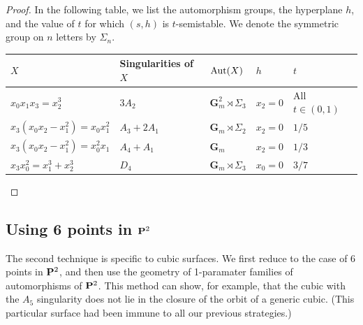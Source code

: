 \documentclass[12pt,reqno]{amsart}
\numberwithin{equation}{section}
\newcommand{\G}{\mathbf G}
\begin{document}
\begin{proof}
  In the following table, we list the automorphism groups, the hyperplane $h$, and the value of $t$ for which $(s,h)$ is $t$-semistable.
  We denote the symmetric group on $n$ letters by $\Sigma_n$.
  \begin{center}
  \begin{tabular}{l l l l l}
    \toprule
    $X$ & Singularities of $X$& $\Aut(X)$ & $h$ & $t$\\
    \midrule
    $x_0x_1x_3 = x_2^3$& $3A_2$&$\G_m^2 \rtimes \Sigma_3$ & $x_2 = 0$ & All $t \in (0,1)$\\
    $x_3(x_0x_2-x_1^2) = x_0x_1^2$& $A_3+2A_1$&$\G_m \rtimes \Sigma_2$ & $x_2 = 0$ & $1/5$ \\
    $x_3(x_0x_2-x_1^2) = x_0^2x_1$&$A_4+A_1$& $\G_m$ & $x_2 = 0$ & $1/3$\\
    $x_3x_0^2 = x_1^3 + x_2^3$&$D_4$& $\G_m \rtimes \Sigma_3$ & $x_0 = 0$ & $3/7$\\
    \bottomrule
  \end{tabular}
\end{center}
\end{proof}

\subsection{Using 6 points in $\P^2$}
The second technique is specific to cubic surfaces.
We first reduce to the case of 6 points in $\P^2$, and then use the geometry of 1-paramater families of automorphisms of $\P^2$.
This method can show, for example, that the cubic with the $A_5$ singularity does not lie in the closure of the orbit of a generic cubic.
(This particular surface had been immune to all our previous strategies.)
\end{document}
